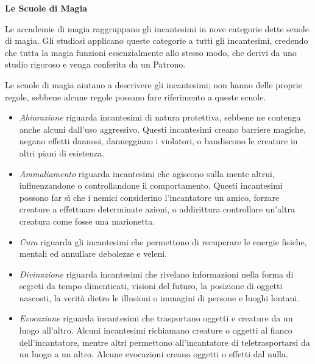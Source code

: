\begin{multicols}{2}
\textbf{Le Scuole di Magia}

Le accademie di magia raggruppano gli incantesimi in nove categorie dette scuole di magia. Gli studiosi applicano queste categorie a tutti gli incantesimi, credendo che tutta la magia funzioni essenzialmente allo stesso modo, che derivi da uno studio rigoroso e venga conferita da un Patrono.

Le scuole di magia aiutano a descrivere gli incantesimi; non hanno delle proprie regole, sebbene alcune regole possano fare riferimento a queste scuole.

\begin{itemize}
\item
\textit{Abiurazione} riguarda incantesimi di natura protettiva, sebbene ne contenga anche alcuni dall'uso aggressivo. Questi incantesimi creano barriere magiche, negano effetti dannosi, danneggiano i violatori, o bandiscono le creature in altri piani di esistenza.

\item
\textit{Ammaliamento} riguarda incantesimi che agiscono sulla mente altrui, influenzandone o controllandone il comportamento. Questi incantesimi possono far sì che i nemici considerino l'incantatore un amico, forzare creature a effettuare determinate azioni, o addirittura controllare un'altra creatura come fosse una marionetta.

\item
\textit{Cura} riguarda gli incantesimi che permettono di recuperare le energie fisiche, mentali ed annullare debolezze e veleni.

\item
\textit{Divinazione} riguarda incantesimi che rivelano informazioni nella forma di segreti da tempo dimenticati, visioni del futuro, la posizione di oggetti nascosti, la verità dietro le illusioni o immagini di persone e luoghi lontani.

\item
\textit{Evocazione} riguarda incantesimi che trasportano oggetti e creature da un luogo all'altro. Alcuni incantesimi richiamano creature o oggetti al fianco dell'incantatore, mentre altri permettono all'incantatore di teletrasportarsi da un luogo a un altro. Alcune evocazioni creano oggetti o effetti dal nulla. 


\end{itemize}
\end{multicols}
